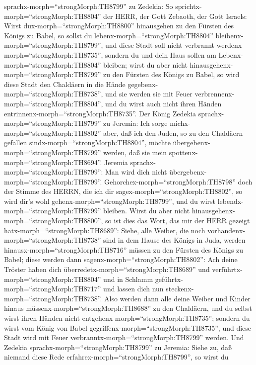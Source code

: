 sprachx-morph=``strongMorph:TH8799'' zu Zedekia: So
sprichtx-morph=``strongMorph:TH8804'' der HERR, der Gott Zebaoth, der
Gott Israels: Wirst dux-morph=``strongMorph:TH8800'' hinausgehen zu den
Fürsten des Königs zu Babel, so sollst du
lebenx-morph=``strongMorph:TH8804''
bleibenx-morph=``strongMorph:TH8799'', und diese Stadt soll nicht
verbrannt werdenx-morph=``strongMorph:TH8735'', sondern du und dein Haus
sollen am Lebenx-morph=``strongMorph:TH8804'' bleiben; 
wirst du aber nicht hinausgehenx-morph=``strongMorph:TH8799'' zu den
Fürsten des Königs zu Babel, so wird diese Stadt den Chaldäern in die
Hände gegebenx-morph=``strongMorph:TH8738'', und sie werden sie mit
Feuer verbrennenx-morph=``strongMorph:TH8804'', und du wirst auch nicht
ihren Händen entrinnenx-morph=``strongMorph:TH8735''.  Der
König Zedekia sprachx-morph=``strongMorph:TH8799'' zu Jeremia: Ich sorge
michx-morph=``strongMorph:TH8802'' aber, daß ich den Juden, so zu den
Chaldäern gefallen sindx-morph=``strongMorph:TH8804'', möchte
übergebenx-morph=``strongMorph:TH8799'' werden, daß sie mein
spottenx-morph=``strongMorph:TH8694''.  Jeremia
sprachx-morph=``strongMorph:TH8799'': Man wird dich nicht
übergebenx-morph=``strongMorph:TH8799''.
Gehorchex-morph=``strongMorph:TH8798'' doch der Stimme des HERRN, die
ich dir sagex-morph=``strongMorph:TH8802'', so wird dir's wohl
gehenx-morph=``strongMorph:TH8799'', und du wirst
lebendx-morph=``strongMorph:TH8799'' bleiben.  Wirst du
aber nicht hinausgehenx-morph=``strongMorph:TH8800'', so ist dies das
Wort, das mir der HERR gezeigt hatx-morph=``strongMorph:TH8689'':
 Siehe, alle Weiber, die noch
vorhandenx-morph=``strongMorph:TH8738'' sind in dem Hause des Königs in
Juda, werden hinausx-morph=``strongMorph:TH8716'' müssen zu den Fürsten
des Königs zu Babel; diese werden dann
sagenx-morph=``strongMorph:TH8802'': Ach deine Tröster haben dich
überredetx-morph=``strongMorph:TH8689'' und
verführtx-morph=``strongMorph:TH8804'' und in Schlamm
geführtx-morph=``strongMorph:TH8717'' und lassen dich nun
steckenx-morph=``strongMorph:TH8738''.  Also werden dann
alle deine Weiber und Kinder hinaus müssenx-morph=``strongMorph:TH8688''
zu den Chaldäern, und du selbst wirst ihren Händen nicht
entgehenx-morph=``strongMorph:TH8735''; sondern du wirst vom König von
Babel gegriffenx-morph=``strongMorph:TH8735'', und diese Stadt wird mit
Feuer verbranntx-morph=``strongMorph:TH8799'' werden.  Und
Zedekia sprachx-morph=``strongMorph:TH8799'' zu Jeremia: Siehe zu, daß
niemand diese Rede erfahrex-morph=``strongMorph:TH8799'', so wirst du
